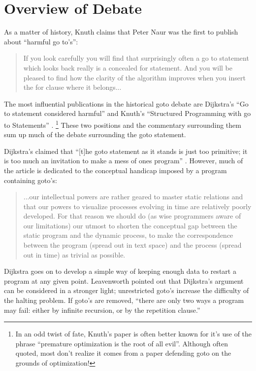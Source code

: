 \documentclass[letterpaper,12pt]{article}
\begin{document}
\section{Overview of Debate}

As a matter of history, Knuth claims \cite{knuth} that Peter Naur was the
first to publish about ``harmful go to's'':

\begin{quote}
If you look carefully you will find that surprisingly often a go to statement
which looks back really is a concealed for statement.  And you will be pleased
to find how the clarity of the algorithm improves when you insert the for clause
where it belongs...
\cite{naur}
\end{quote}

The most influential publications in the historical goto debate are Dijkstra's
``Go to statement considered harmful'' \cite{dijkstra} and Knuth's ``Structured
Programming with go to Statements'' \cite{knuth}. \footnote{In an odd twist
of fate, Knuth's paper is often better known for it's use of the phrase
``premature optimization is the root of all evil''.  Although often quoted,
most don't realize it comes from a paper defending goto on the grounds of
optimization!}  These two positions and the commentary surrounding them sum up
much of the debate surrounding the goto statement.

Dijkstra's claimed that ``[t]he goto statement as it stands is just too primitive;
it is too much an invitation to make a mess of ones program'' \cite{dijkstra}.
However, much of the article is dedicated to the conceptual handicap imposed
by a program containing goto's:

\begin{quote}
...our intellectual powers are rather geared to master static relations and that
our powers to visualize processes evolving in time are relatively poorly developed.
For that reason we should do (as wise programmers aware of our limitations) our
utmost to shorten the conceptual gap between the static program and the dynamic
process, to make the correspondence between the program (spread out in text space)
and the process (spread out in time) as trivial as possible.
\cite{dijkstra}
\end{quote}

Dijkstra goes on to develop a simple way of keeping enough data to restart a
program at any given point.  Leavenworth pointed out that Dijkstra's argument
can be considered in a stronger light; unrestricted goto's increase the
difficulty of the halting problem.  If goto's are removed, ``there are only
two ways a program may fail: either by infinite recursion, or by the repetition
clause.'' \cite{leavenworth}
\end{document}
